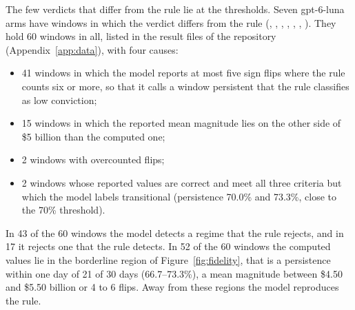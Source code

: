 The few verdicts that differ from the rule lie at the thresholds. Seven gpt-6-luna arms have windows in which the verdict differs from the rule (, , , , , , ). They hold 60 windows in all, listed in the result files of the repository (Appendix~\ref{app:data}), with four causes:
\begin{itemize}
\item 41 windows in which the model reports at most five sign flips where the rule counts six or more, so that it calls a window persistent that the rule classifies as low conviction;
\item 15 windows in which the reported mean magnitude lies on the other side of \$5 billion than the computed one;
\item 2 windows with overcounted flips;
\item 2 windows whose reported values are correct and meet all three criteria but which the model labels transitional (persistence 70.0\% and 73.3\%, close to the 70\% threshold).
\end{itemize}
In 43 of the 60 windows the model detects a regime that the rule rejects, and in 17 it rejects one that the rule detects. In 52 of the 60 windows the computed values lie in the borderline region of Figure~\ref{fig:fidelity}, that is a persistence within one day of 21 of 30 days (66.7--73.3\%), a mean magnitude between \$4.50 and \$5.50 billion or 4 to 6 flips. Away from these regions the model reproduces the rule.

